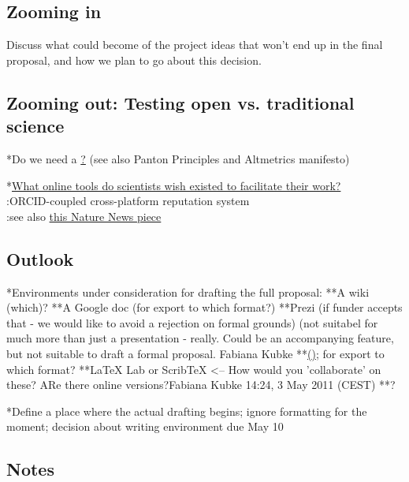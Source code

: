 \documentclass[final,authoryear,3p]{elsarticle-open-drafting}
\begin{document}
\begin{enumerate}
\subsection{Zooming in}
Discuss what could become of the project ideas that won't end up in the final proposal, and how we plan to go about this decision.

\subsection{Zooming out: Testing open vs. traditional science}

*Do we need a \href{http://open-science.pen.io/ manifesto for open science}? (see also Panton Principles and Altmetrics manifesto)

*\href{http://www.quora.com/What-online-tools-do-scientists-wish-existed-to-facilitate-their-work/answer/Marius-Kempe}{What online tools do scientists wish existed to facilitate their work?}\\
:ORCID-coupled cross-platform reputation system\\
:see also \href{http://www.nature.com/news/2011/110511/full/473138a.html}{this Nature News piece}

\subsection{Outlook}



*Environments under consideration for drafting the full proposal:
**A wiki (which)?
**A Google doc (for export to which format?)
**Prezi (if funder accepts that - we would like to avoid a rejection on formal grounds) (not suitabel for much more than just a presentation - really. Could be an accompanying feature, but not suitable to draft a formal proposal. Fabiana Kubke
**\href{https://github.com/Daniel-Mietchen/Open-Research-Proposals GitHub} (\href{http://marciovm.com/i-want-a-github-of-science background}); for export to which format?
**LaTeX Lab or ScribTeX <-- How would you 'collaborate' on these? ARe there online versions?Fabiana Kubke 14:24, 3 May 2011 (CEST)
**?

*Define a place where the actual drafting begins; ignore formatting for the moment; decision about writing environment due May 10

\subsection{Notes}


\end{enumerate}
\end{document}
